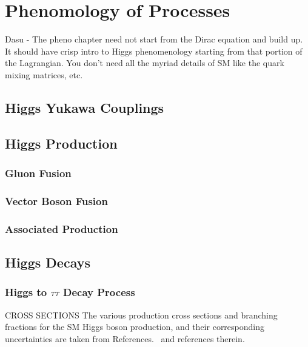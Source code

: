 \chapter{Phenomology of Processes}

Dasu -
The pheno chapter need not start from the Dirac equation and build up. It should have crisp intro to Higgs phenomenology starting from that portion of the Lagrangian. You don’t need all the myriad details of SM like the quark mixing matrices, etc.

\section{Higgs Yukawa Couplings}

\section{Higgs Production}

\subsection{Gluon Fusion}

\subsection{Vector Boson Fusion}

\subsection{Associated Production}

\section{Higgs Decays}

\subsection{Higgs to $\tau\tau$ Decay Process}

CROSS SECTIONS
The various production cross sections and branching fractions for the SM Higgs 
boson production, and their corresponding uncertainties are taken from 
References.~\cite{deFlorian:2016spz,Denner:2011mq,Ball:2011mu} and references therein.
